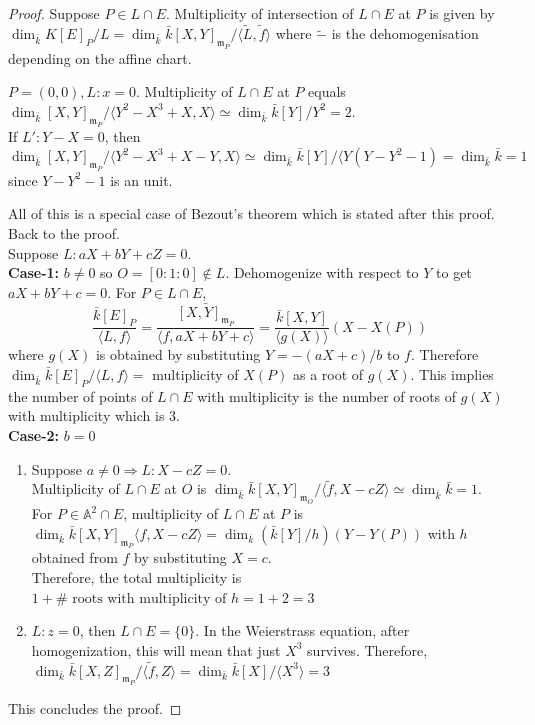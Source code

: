 \documentclass[oneside, 12pt, ]{scrbook}
\newcommand{\Aa}{\mathbb{A}}
\newcommand{\m}{\mathfrak{m}}
\theoremstyle{theorem}
\begin{document}
\begin{proof}
Suppose $P \in L \cap E$. Multiplicity of intersection of $L \cap E$ at $P$ is given by $\dim_{\bar{k}}K[E]_{P}/L = \dim_{\bar{k}}\bar{k}[X,Y]_{\m_{P}}/\langle \tilde{L}, \tilde{f} \rangle$ where $\tilde{-}$ is the dehomogenisation depending on the affine chart.
\begin{example}
$P=(0,0), L :x=0$. Multiplicity of $L\cap E$ at $P$ equals $\dim_{\bar{k}}[X,Y]_{\m_{P}}/\langle Y^2 - X^3 + X, X\rangle \simeq \dim_{\bar{k}} \bar{k}[Y]/Y^2 = 2$. \\

If $L': Y-X=0$, then $\dim_{\bar{k}}[X,Y]_{\m_{P}}/\langle Y^2 - X^3 + X-Y, X\rangle \simeq \dim_{\bar{k}} \bar{k}[Y]/\langle Y(Y - Y^2 -1) = \dim_{\bar{k}}\bar{k}=1$ since $Y-Y^2 -1$ is an unit.
\end{example}
All of this is a special case of Bezout's theorem which is stated after this proof.\\

Back to the proof. \\

Suppose $L : aX+bY+cZ=0$.\\ 
\textbf{Case-1:} $b\neq 0$ so $O = [0:1:0] \not \in L$. Dehomogenize with respect to $Y$ to get $aX+bY+c=0$. For $P \in L \cap E$, $$\frac{\bar{k}[E]_{P}}{\langle L,f \rangle } = \frac{\bar{[X,Y]_{\m_{P}}}}{\langle f, aX+bY+c \rangle} = \frac{\bar{k}[X,Y]}{\langle g(X) \rangle} (X-X(P))$$ where $g(X)$ is obtained by substituting $Y = -(aX+c)/b$ to $f$. Therefore $\dim_{\bar{k}}\bar{k}[E]_{P}/ \langle L , f \rangle =$ multiplicity of $X(P)$ as a root of $g(X)$. This implies the number of points of $L \cap E$ with multiplicity is the number of roots of $g(X)$ with multiplicity which is $3$. \\

\textbf{Case-2:} $b=0$
\begin{enumerate}
\item Suppose $a \neq 0 \Rightarrow L: X-cZ=0$. \\
Multiplicity of $L \cap E$ at $O$ is $\dim_{\bar{k}}\bar{k}[X,Y]_{\m_{O}}/ \langle \tilde{f} , X-cZ \rangle \simeq \dim_{\bar{k}} \bar{k} = 1$. \\
For $P \in \Aa^2 \cap E$, multiplicity of $L\cap E$ at $P$ is $\dim_{\bar{k}}\bar{k}[X,Y]_{\m_{P}} \langle f, X-cZ \rangle  = \dim_{\bar{k}}(\bar{k}[Y]/h)(Y-Y(P))$ with $h$ obtained from $f$ by substituting $X=c$. \\
Therefore, the total multiplicity is $1 + \#\text{ roots with multiplicity of } h = 1+2 =3$
\item $L : z=0$, then $L \cap E = \{0\}$. In the Weierstrass equation, after homogenization, this will mean that just $X^3$ survives. Therefore, $\dim_{\bar{k}} \bar{k}[X,Z]_{\m_{P}}/ \langle \tilde{f} , Z \rangle = \dim_{\bar{k}} \bar{k}[X]/\langle X^3 \rangle = 3$
\end{enumerate}
This concludes the proof.
\end{proof}
\end{document}
